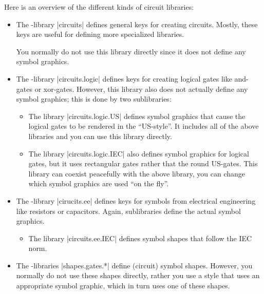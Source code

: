 Here is an overview of the different kinds of circuit libraries:
%
\begin{itemize}
    \item The \tikzname-library |circuits| defines general keys for creating
        circuits. Mostly, these keys are useful for defining more specialized
        libraries.

        You normally do not use this library directly since it does not define
        any symbol graphics.
    \item The \tikzname-library |circuits.logic| defines keys for creating
        logical gates like and-gates or xor-gates. However, this library also
        does not actually define any symbol graphics; this is done by two
        sublibraries:
        \begin{itemize}
            \item The library |circuits.logic.US| defines symbol graphics that
                cause the logical gates to be rendered in the ``US-style''. It
                includes all of the above libraries and you can use this
                library directly.
            \item The library |circuits.logic.IEC| also defines symbol graphics
                for logical gates, but it uses rectangular gates rather that
                the round US-gates. This library can coexist peacefully with
                the above library, you can change which symbol graphics are
                used ``on the fly''.
        \end{itemize}
    \item The \tikzname-library |cirucits.ee| defines keys for symbols from
        electrical engineering like resistors or capacitors. Again,
        sublibraries define the actual symbol graphics.
        \begin{itemize}
            \item The library |circuits.ee.IEC| defines symbol shapes that
                follow the IEC norm.
        \end{itemize}
    \item The \pgfname-libraries |shapes.gates.*| define (circuit) symbol
        shapes. However, you normally do not use these shapes directly, rather
        you use a style that uses an appropriate symbol graphic, which in turn
        uses one of these shapes.
\end{itemize}

